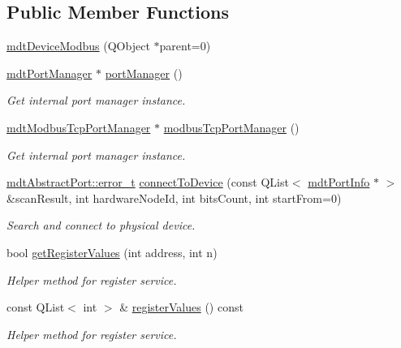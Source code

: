 \subsection*{Public Member Functions}
\begin{DoxyCompactItemize}
\item 
\hyperlink{classmdt_device_modbus_ac69cfbe26681342ba05672ab63de2a1f}{mdtDeviceModbus} (QObject $\ast$parent=0)
\item 
\hypertarget{classmdt_device_modbus_aed892b501f8cbd372ccfda1a4fafa536}{
\hyperlink{classmdt_port_manager}{mdtPortManager} $\ast$ \hyperlink{classmdt_device_modbus_aed892b501f8cbd372ccfda1a4fafa536}{portManager} ()}
\label{classmdt_device_modbus_aed892b501f8cbd372ccfda1a4fafa536}

\begin{DoxyCompactList}\small\item\em Get internal port manager instance. \end{DoxyCompactList}\item 
\hypertarget{classmdt_device_modbus_ac547788aa95d46c00ddb1342eb46ef93}{
\hyperlink{classmdt_modbus_tcp_port_manager}{mdtModbusTcpPortManager} $\ast$ \hyperlink{classmdt_device_modbus_ac547788aa95d46c00ddb1342eb46ef93}{modbusTcpPortManager} ()}
\label{classmdt_device_modbus_ac547788aa95d46c00ddb1342eb46ef93}

\begin{DoxyCompactList}\small\item\em Get internal port manager instance. \end{DoxyCompactList}\item 
\hyperlink{classmdt_abstract_port_ad4121bb930c95887e77f8bafa065a85e}{mdtAbstractPort::error\_\-t} \hyperlink{classmdt_device_modbus_a323b16687f448a4e45eb0b313635b77f}{connectToDevice} (const QList$<$ \hyperlink{classmdt_port_info}{mdtPortInfo} $\ast$ $>$ \&scanResult, int hardwareNodeId, int bitsCount, int startFrom=0)
\begin{DoxyCompactList}\small\item\em Search and connect to physical device. \end{DoxyCompactList}\item 
bool \hyperlink{classmdt_device_modbus_a89d41c6b33a3dd2a92a0956d8e6b3b14}{getRegisterValues} (int address, int n)
\begin{DoxyCompactList}\small\item\em Helper method for register service. \end{DoxyCompactList}\item 
const QList$<$ int $>$ \& \hyperlink{classmdt_device_modbus_a83cb2a28111653fbcbbe748f7a1a2e3d}{registerValues} () const 
\begin{DoxyCompactList}\small\item\em Helper method for register service. \end{DoxyCompactList}\end{DoxyCompactItemize}
